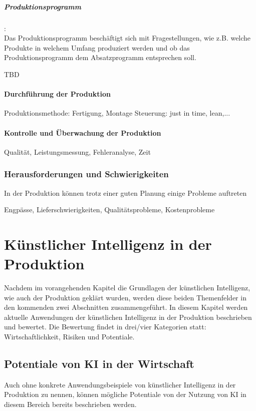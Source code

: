 \documentclass[a4paper,12pt, german]{report}
\begin{document}
\paragraph{Produktionsprogramm}: $ $ \\ Das Produktionsprogramm beschäftigt sich mit Fragestellungen, wie z.B. welche Produkte in welchem Umfang produziert werden und ob das Produktionsprogramm dem Absatzprogramm entsprechen soll. 

TBD



\subsubsection{Durchführung der Produktion}
Produktionsmethode: Fertigung, Montage
Steuerung: just in time, lean,...

\subsubsection{Kontrolle und Überwachung der Produktion}

Qualität, Leistungsmessung, Fehleranalyse, Zeit

\subsection{Herausforderungen und Schwierigkeiten}
In der Produktion können trotz einer guten Planung einige Probleme auftreten

Engpässe, Lieferschwierigkeiten, Qualitätsprobleme, Kostenprobleme


\chapter{Künstlicher Intelligenz in der Produktion}

Nachdem im vorangehenden Kapitel die Grundlagen der künstlichen Intelligenz, wie auch der Produktion geklärt wurden, werden diese beiden Themenfelder in den kommenden zwei Abschnitten zusammengeführt. In diesem Kapitel werden aktuelle Anwendungen der künstlichen Intelligenz in der Produktion beschrieben und bewertet. Die Bewertung findet in drei/vier Kategorien statt: Wirtschaftlichkeit, Risiken und Potentiale.

\section{Potentiale von KI in der Wirtschaft}
Auch ohne konkrete Anwendungsbeispiele von künstlicher Intelligenz in der Produktion zu nennen, können mögliche Potentiale von der Nutzung von KI in diesem Bereich bereits beschrieben werden.
\end{document}
